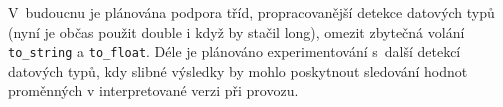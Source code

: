 \documentclass[czech]{ExcelAtFIT}
\newcommand{\function}[1]{\texttt{#1}}
\begin{document}
	V~budoucnu je plánována podpora tříd, propracovanější detekce datových typů (nyní je občas použit double i když by stačil long), omezit zbytečná volání \function{to\_string} a \function{to\_float}. Déle je plánováno experimentování s~další detekcí datových typů, kdy slibné výsledky by mohlo poskytnout sledování hodnot proměnných v interpretované verzi při provozu.





\end{document}
